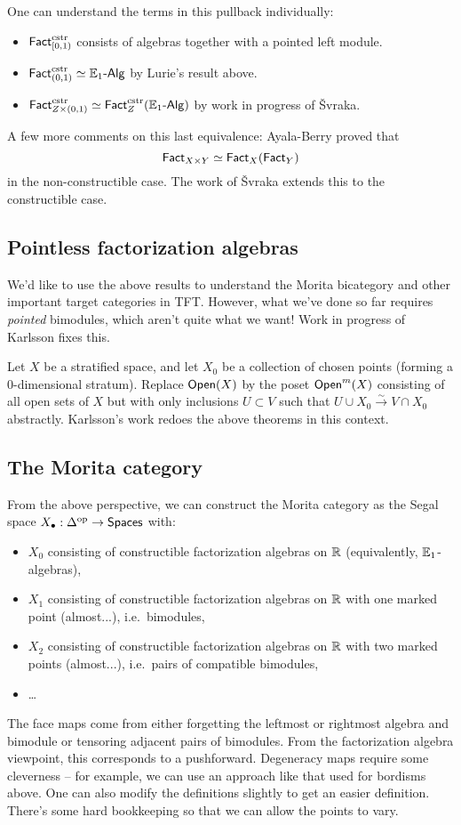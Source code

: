 One can understand the terms in this pullback individually:
\begin{itemize}
	\item $\mathsf{Fact}_{[0,1)}^{\mathrm{cstr}}$ consists of algebras together with a pointed left module.
	\item $\mathsf{Fact}_{(0,1)}^{\mathrm{cstr}} \simeq \mathbb{E}_1\textrm{-}\mathsf{Alg}$ by Lurie's result above.
	\item $\mathsf{Fact}_{Z \times (0,1)}^{\mathrm{cstr}} \simeq \mathsf{Fact}_Z^{\mathrm{cstr}}(\mathbb{E}_1\textrm{-}\mathsf{Alg})$ by work in progress of \v{S}vraka.
\end{itemize}
A few more comments on this last equivalence: Ayala-Berry proved that
\[
	\mathsf{Fact}_{X \times Y} \simeq \mathsf{Fact}_X(\mathsf{Fact}_Y)
\]
in the non-constructible case.
The work of \v{S}vraka extends this to the constructible case.

\subsection{Pointless factorization algebras}

We'd like to use the above results to understand the Morita bicategory and other important target categories in TFT.
However, what we've done so far requires \emph{pointed} bimodules, which aren't quite what we want!
Work in progress of Karlsson fixes this.

Let $X$ be a stratified space, and let $X_0$ be a collection of chosen points (forming a 0-dimensional stratum).
Replace $\mathsf{Open}(X)$ by the poset $\mathsf{Open}^m(X)$ consisting of all open sets of $X$ but with only inclusions $U \subset V$ such that $U \cup X_0 \xrightarrow{\sim} V \cap X_0$ abstractly.
Karlsson's work redoes the above theorems in this context.

\subsection{The Morita category}

From the above perspective, we can construct the Morita category as the Segal space $X_\bullet: \Delta^{\mathrm{op}} \to \mathsf{Spaces}$ with:
\begin{itemize}
	\item $X_0$ consisting of constructible factorization algebras on $\mathbb{R}$ (equivalently, $\mathbb{E}_1$-algebras),
	\item $X_1$ consisting of constructible factorization algebras on $\mathbb{R}$ with one marked point (almost...), i.e.\ bimodules,
	\item $X_2$ consisting of constructible factorization algebras on $\mathbb{R}$ with two marked points (almost...), i.e.\ pairs of compatible bimodules,
	\item \dots
\end{itemize}
The face maps come from either forgetting the leftmost or rightmost algebra and bimodule or tensoring adjacent pairs of bimodules.
From the factorization algebra viewpoint, this corresponds to a pushforward.
Degeneracy maps require some cleverness -- for example, we can use an approach like that used for bordisms above.
One can also modify the definitions slightly to get an easier definition.
There's some hard bookkeeping so that we can allow the points to vary.

